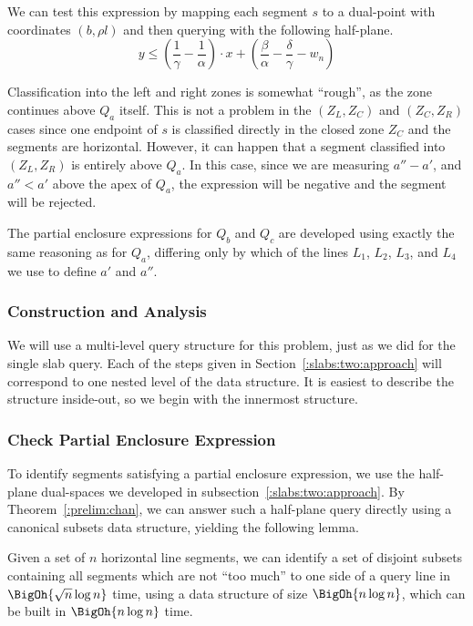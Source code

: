 \noindent We can test this expression by mapping each segment $s$ to a dual-point with coordinates $(b, \rho l)$ and then querying with the following half-plane.
\[
y \leq \left ( \frac{1}{\gamma} - \frac{1}{\alpha} \right ) \cdot x + \left ( \frac{\beta}{\alpha} - \frac{\delta}{\gamma} - w_n \right )
\]

\noindent Classification into the left and right zones is somewhat ``rough'', as the zone continues above $Q_a$ itself. 
This is not a problem in the $(Z_L, Z_C)$ and $(Z_C, Z_R)$ cases since one endpoint of $s$ is classified directly in the closed zone $Z_C$ and the segments are horizontal.
However, it can happen that a segment classified into $(Z_L, Z_R)$ is entirely above $Q_a$. 
In this case, since we are measuring $a'' - a'$, and $a'' < a'$ above the apex of $Q_a$, the expression will be negative and the segment will be rejected.

The partial enclosure expressions for $Q_b$ and $Q_c$ are developed using exactly the same reasoning as for $Q_a$, differing only by which of the lines $L_1$, $L_2$, $L_3$, and $L_4$ we use to define $a'$ and $a''$.


\subsubsection{Construction and Analysis}
\label{:slabs:two:analysis}

We will use a multi-level query structure for this problem, just as we did for the single slab query.
Each of the steps given in Section~\ref{:slabs:two:approach} will correspond to one nested level of the data structure.
It is easiest to describe the structure inside-out, so we begin with the innermost structure.

\subsubsection{Check Partial Enclosure Expression}

To identify segments satisfying a partial enclosure expression, we use the half-plane dual-spaces we developed in subsection~\ref{:slabs:two:approach}. 
By Theorem~\ref{:prelim:chan}, we can answer such a half-plane query directly using a canonical subsets data structure, yielding the following lemma.

\begin{lemma}
\label{lem:slabs:two:step1}
Given a set of $n$ horizontal line segments, we can identify a set of disjoint subsets containing all segments which are not ``too much'' to one side of a query line in $\BigOh{\sqrt{n}\log{n}}$ time, using a data structure of size $\BigOh{n\log{n}}$, which can be built in $\BigOh{n\log{n}}$ time.
\end{lemma}

